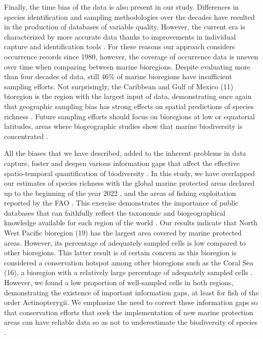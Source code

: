 \documentclass[12pt,authoryear]{elsarticle}
\begin{document}
Finally, the time bias of the data is also present in our study. Differences in species identification and sampling methodologies over the decades have resulted in the production of databases of variable quality. However, the current era is characterized by more accurate data thanks to improvements in individual capture and identification tools \citep{costello2015conser,jin2020bdcleaner}. For these reasons our approach considers occurrence records since 1980, however, the coverage of occurrence data is uneven over time when comparing between marine bioregions. Despite evaluating more than four decades of data, still 46\% of marine bioregions have insufficient sampling efforts. Not surprisingly, the Caribbean and Gulf of Mexico (11) bioregion is the region with the largest input of data, demonstrating once again that geographic sampling bias has strong effects on spatial predictions of species richness \citep{yang2013geographical}. Future sampling efforts should focus on bioregions at low or equatorial latitudes, areas where biogeographic studies show that marine biodiversity is concentrated \citep{costello2017marine}.

All the biases that we have described, added to the inherent problems in data capture, foster and deepen various information gaps that affect the effective spatio-temporal quantification of biodiversity \citep{magurran2011}. In this study, we have overlapped our estimates of species richness with the global marine protected areas declared up to the beginning of the year 2022 \citep{wcmc2022}, and the areas of fishing exploitation reported by the FAO \citep{fao2014}. This exercise demonstrates the importance of public databases that can faithfully reflect the taxonomic and biogeographical knowledge available for each region of the world \citep{pelayo2018}.
%
Our results indicate that North West Pacific bioregion (19) has the largest area covered by marine protected areas. However, its percentage of adequately sampled cells is low compared to other bioregions. This latter result is of certain concern as this bioregion is considered a conservation hotspot among other bioregions such as the Coral Sea (16), a bioregion with a relatively large  percentage of adequately sampled cells \citep{ramirez2017climate}. 
%
However, we found a low proportion of well-sampled cells in both regions, demonstrating the existence of important information gaps, at least for fish of the order Actinopterygii. We emphasize the need to correct these information gaps so that conservation efforts that seek the implementation of new marine protection areas can have reliable data so as not to underestimate the biodiversity of species \citep{sala2021}.
\end{document}
